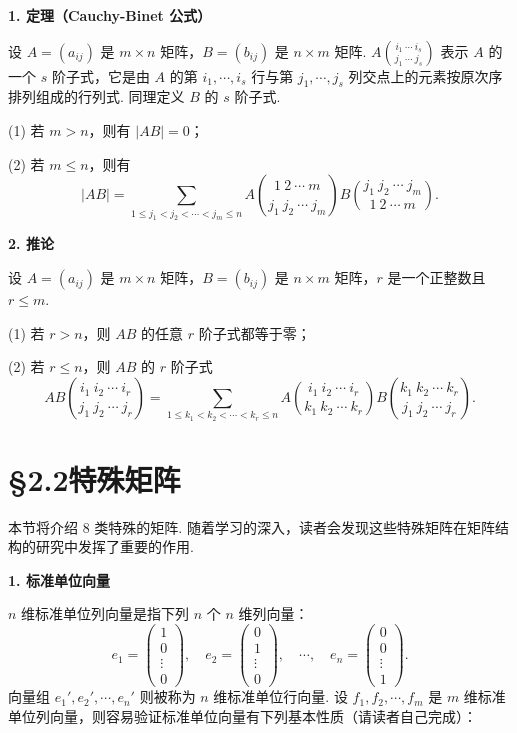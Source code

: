 \documentclass[UTF8,12pt,a4paper,fontset=fandol]{ctexart}
\begin{document}
\noindent\textbf{1. 定理（Cauchy-Binet 公式）}

设 $A=(a_{ij})$ 是 $m\times n$ 矩阵，$B=(b_{ij})$ 是 $n\times m$ 矩阵. $A\binom{i_1\ \cdots\ i_s}{j_1\ \cdots\ j_s}$ 表示 $A$ 的一个 $s$ 阶子式，它是由 $A$ 的第 $i_1,\cdots,i_s$ 行与第 $j_1,\cdots,j_s$ 列交点上的元素按原次序排列组成的行列式. 同理定义 $B$ 的 $s$ 阶子式.

(1) 若 $m>n$，则有 $|AB|=0$；

(2) 若 $m\le n$，则有
\[
|AB|=
\sum_{1\le j_1<j_2<\cdots<j_m\le n}
A\binom{1\ 2\ \cdots\ m}{j_1\ j_2\ \cdots\ j_m}
B\binom{j_1\ j_2\ \cdots\ j_m}{1\ 2\ \cdots\ m}.
\]

\noindent\textbf{2. 推论}

设 $A=(a_{ij})$ 是 $m\times n$ 矩阵，$B=(b_{ij})$ 是 $n\times m$ 矩阵，$r$ 是一个正整数且 $r\le m$.

(1) 若 $r>n$，则 $AB$ 的任意 $r$ 阶子式都等于零；

(2) 若 $r\le n$，则 $AB$ 的 $r$ 阶子式
\[
AB\binom{i_1\ i_2\ \cdots\ i_r}{j_1\ j_2\ \cdots\ j_r}
=
\sum_{1\le k_1<k_2<\cdots<k_r\le n}
A\binom{i_1\ i_2\ \cdots\ i_r}{k_1\ k_2\ \cdots\ k_r}
B\binom{k_1\ k_2\ \cdots\ k_r}{j_1\ j_2\ \cdots\ j_r}.
\]

\section*{§2.2\quad 特殊矩阵}

本节将介绍 8 类特殊的矩阵. 随着学习的深入，读者会发现这些特殊矩阵在矩阵结构的研究中发挥了重要的作用.

\noindent\textbf{1. 标准单位向量}

$n$ 维标准单位列向量是指下列 $n$ 个 $n$ 维列向量：
\[
e_1=\left(\begin{array}{c}1\\0\\ \vdots\\0\end{array}\right),\quad
e_2=\left(\begin{array}{c}0\\1\\ \vdots\\0\end{array}\right),\quad
\cdots,\quad
e_n=\left(\begin{array}{c}0\\0\\ \vdots\\1\end{array}\right).
\]
向量组 $e_1',e_2',\cdots,e_n'$ 则被称为 $n$ 维标准单位行向量. 设 $f_1,f_2,\cdots,f_m$ 是 $m$ 维标准单位列向量，则容易验证标准单位向量有下列基本性质（请读者自己完成）：
\end{document}
